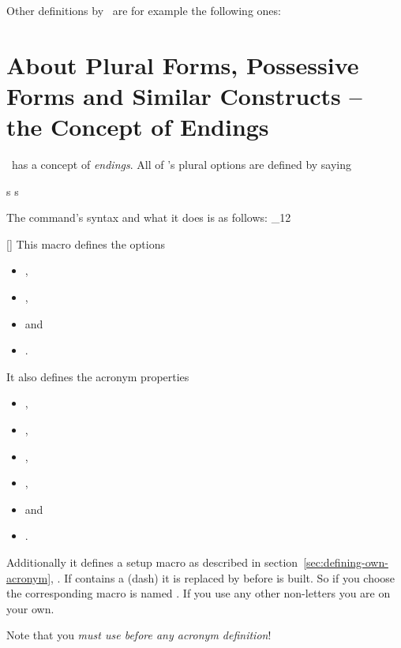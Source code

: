 \documentclass[load-preamble+]{cnltx-doc}
\makeatletter
\renewenvironment{commands}
  {%
    \cnltx@set@catcode_{12}%
    \let\command\cnltx@command
    \cnltxlist
  }
  {\endcnltxlist}
\makeatother
\begin{document}
Other definitions by \acro\ are for example the following ones:

\section{About Plural Forms, Possessive Forms and Similar Constructs -- the
  Concept of Endings}

\acro\ has a concept of \emph{endings}.  All of \acro's plural options are
defined by saying
\begin{sourcecode}
   {s} {s}
\end{sourcecode}
The command's syntax and what it does is as follows:
\begin{commands}
  \command{ProvideAcroEnding}[]
    This macro defines the options
    \begin{itemize}
      \item {},
      \item {},
      \item {} and
      \item {}.
    \end{itemize}
    It also defines the acronym properties
    \begin{itemize}
      \item {},
      \item {},
      \item {},
      \item {},
      \item {} and
      \item {}.
    \end{itemize}
    Additionally it defines a setup macro as
    described in section~\ref{sec:defining-own-acronym},
    .  If  contains a \code{-} (dash) it is
    replaced by \code{\_} before  is built.  So if you
    choose  the corresponding macro is named
    .  If you use any other non-letters you are on your
    own.

    Note that you \emph{must use  before any acronym
      definition}!
\end{commands}
\end{document}

